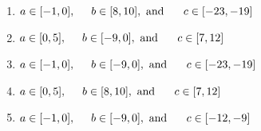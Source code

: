 \documentclass[14pt]{extbook}
\begin{document}
\begin{enumerate}
{\begin{center}
\end{center}
\begin{enumerate}[label=\Alph*.]
\item \( a \in [-1, 0], \hspace*{5mm} b \in [8, 10], \text{ and } \hspace*{5mm} c \in [-23, -19] \)
\item \( a \in [0, 5], \hspace*{5mm} b \in [-9, 0], \text{ and } \hspace*{5mm} c \in [7, 12] \)
\item \( a \in [-1, 0], \hspace*{5mm} b \in [-9, 0], \text{ and } \hspace*{5mm} c \in [-23, -19] \)
\item \( a \in [0, 5], \hspace*{5mm} b \in [8, 10], \text{ and } \hspace*{5mm} c \in [7, 12] \)
\item \( a \in [-1, 0], \hspace*{5mm} b \in [-9, 0], \text{ and } \hspace*{5mm} c \in [-12, -9] \)

\end{enumerate} }
\end{enumerate}
\end{document}
